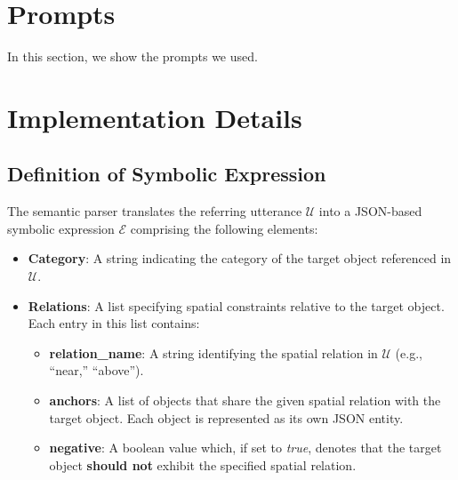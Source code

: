 \newpage
\appendix
\twocolumn

\section{Prompts}

In this section, we show the prompts we used.

\setcounter{lstlisting}{0}










\section{Implementation Details}
\subsection{Definition of Symbolic Expression}
\label{sec:symbolic_expression}

The semantic parser translates the referring utterance $\mathcal{U}$ into a JSON-based symbolic expression $\mathcal{E}$ comprising the following elements:

\begin{itemize}
    \item \textbf{Category}: A string indicating the category of the target object referenced in $\mathcal{U}$.

    \item \textbf{Relations}: A list specifying spatial constraints relative to the target object. Each entry in this list contains:
    \begin{itemize}
        \item \textbf{relation\_name}: A string identifying the spatial relation in $\mathcal{U}$ (e.g., ``near,'' ``above'').
        \item \textbf{anchors}: A list of objects that share the given spatial relation with the target object. Each object is represented as its own JSON entity.
        \item \textbf{negative}: A boolean value which, if set to \textit{true}, denotes that the target object \textbf{should not} exhibit the specified spatial relation.
    \end{itemize}
\end{itemize}

